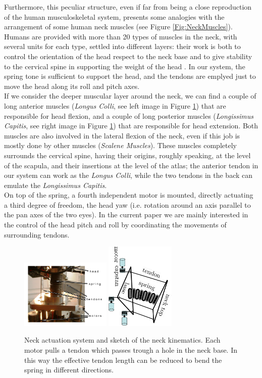 \documentclass[conference]{IEEEtran}
\numberwithin{equation}{section}
\begin{document}
Furthermore, this peculiar structure, even if far from being a close reproduction of the human musculoskeletal system, presents some analogies with the arrangement of some human neck muscles (see Figure \ref{Fig:NeckMuscles}). Humans are provided with more than 20 types of muscles in the neck, with several units for each type, settled into different layers: their work is both to control the orientation of the head respect to the neck base and to give stability to the cervical spine in supporting the weight of the head \cite{Kendall05muscles}. In our system, the spring tone is sufficient to support the head, and the tendons are emplyed just to move the head along its roll and pitch axes.\\If we consider the deeper muscular layer around the neck, we can find a couple of long anterior muscles (\emph{Longus Colli}, see left image in Figure \ref{Fig:HeadAct}) that are responsible for head flexion, and a couple of long posterior muscles (\emph{Longissimus Capitis}, see right image in Figure \ref{Fig:HeadAct}) that are responsible for head extension. Both muscles are also involved in the lateral flexion of the neck, even if this job is mostly done by other muscles (\emph{Scalene Muscles}). These muscles completely surrounds the cervical spine, having their origins, roughly speaking, at the level of the scapula, and their insertions at the level of the atlas; the anterior tendon in our system can work as the \emph{Longus Colli}, while the two tendons in the back can emulate the \emph{Longissimus Capitis}.\\On top of the spring, a fourth independent motor is mounted, directly actuating a third degree of freedom, the head yaw (i.e. rotation around an axis parallel to the pan axes of the two eyes). In the current paper we are mainly interested in the control of the head pitch and roll by coordinating the movements of surrounding tendons.

\begin{figure}[tbp]
\centering
\includegraphics[width=43mm]{image/HeadAct.pdf} 
\includegraphics[width=33mm, angle=90]{image/NeckModelScheme.pdf} 
\caption{Neck actuation system and sketch of the neck kinematics. Each motor pulls a tendon which passes trough a hole in the neck base. In this way the effective tendon length can be reduced to bend the spring in different directions.}
\label{Fig:HeadAct}
\end{figure}
\end{document}
